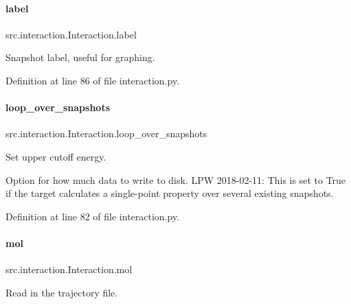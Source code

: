 \paragraph{\texorpdfstring{label}{label}}
{\footnotesize\ttfamily src.\+interaction.\+Interaction.\+label}



Snapshot label, useful for graphing. 



Definition at line 86 of file interaction.\+py.

\mbox{\label{classsrc_1_1interaction_1_1Interaction_a1410b7854f7d2d4758eefd757798873f}} 
\paragraph{\texorpdfstring{loop\+\_\+over\+\_\+snapshots}{loop\_over\_snapshots}}
{\footnotesize\ttfamily src.\+interaction.\+Interaction.\+loop\+\_\+over\+\_\+snapshots}



Set upper cutoff energy. 

Option for how much data to write to disk. L\+PW 2018-\/02-\/11\+: This is set to True if the target calculates a single-\/point property over several existing snapshots. 

Definition at line 82 of file interaction.\+py.

\mbox{\label{classsrc_1_1interaction_1_1Interaction_a3607dc785b20dfb46c141137294cfd41}} 
\paragraph{\texorpdfstring{mol}{mol}}
{\footnotesize\ttfamily src.\+interaction.\+Interaction.\+mol}



Read in the trajectory file. 




